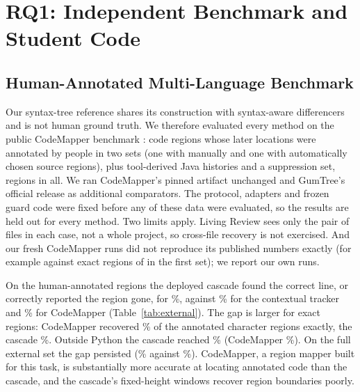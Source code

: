 \section{RQ1: Independent Benchmark and Student Code}\label{sec:external}
\subsection{Human-Annotated Multi-Language Benchmark}
Our syntax-tree reference shares its construction with syntax-aware differencers and is not human ground truth. We therefore evaluated every method on the public CodeMapper benchmark \cite{hu2026codemapper}: \cExtHumN{} code regions whose later locations were annotated by people in two sets (one with manually and one with automatically chosen source regions), plus tool-derived Java histories and a suppression set, \cExtExtN{} regions in all. We ran CodeMapper's pinned artifact unchanged and GumTree's official release as additional comparators. The protocol, adapters and frozen guard code were fixed before any of these data were evaluated, so the results are held out for every method. Two limits apply. Living Review sees only the pair of files in each case, not a whole project, so cross-file recovery is not exercised. And our fresh CodeMapper runs did not reproduce its published numbers exactly (for example \cRepAObserved{} against \cRepAPublished{} exact regions of \cRepAN{} in the first set); we report our own runs.



On the human-annotated regions the deployed cascade found the correct line, or correctly reported the region gone, for \cExtHumDepAcc\%, against \cExtHumTrkAcc\% for the contextual tracker and \cExtHumCmAcc\% for CodeMapper (Table~\ref{tab:external}). The gap is larger for exact regions: CodeMapper recovered \cExtHumCmChars\% of the annotated character regions exactly, the cascade \cExtHumDepChars\%. Outside Python the cascade reached \cExtHumNpDepAcc\% (CodeMapper \cExtHumNpCmAcc\%). On the full external set the gap persisted (\cExtExtDepAcc\% against \cExtExtCmAcc\%). CodeMapper, a region mapper built for this task, is substantially more accurate at locating annotated code than the cascade, and the cascade's fixed-height windows recover region boundaries poorly.

